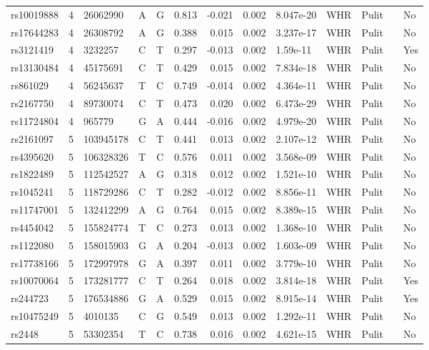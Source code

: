 \documentclass[11pt,twoside]{bristolthesis}
\begin{document}
\begin{longtable}[t]{lrlllrrrlllll}
rs10019888 & 4 & 26062990 & A & G & 0.813 & -0.021 & 0.002 & 8.047e-20 & WHR & Pulit &  & No\\
\addlinespace
rs17644283 & 4 & 26308792 & A & G & 0.388 & 0.015 & 0.002 & 3.237e-17 & WHR & Pulit &  & No\\
rs3121419 & 4 & 3232257 & C & T & 0.297 & -0.013 & 0.002 & 1.59e-11 & WHR & Pulit &  & Yes\\
rs13130484 & 4 & 45175691 & C & T & 0.429 & 0.015 & 0.002 & 7.834e-18 & WHR & Pulit &  & No\\
rs861029 & 4 & 56245637 & T & C & 0.749 & -0.014 & 0.002 & 4.364e-11 & WHR & Pulit &  & No\\
rs2167750 & 4 & 89730074 & C & T & 0.473 & 0.020 & 0.002 & 6.473e-29 & WHR & Pulit &  & No\\
\addlinespace
rs11724804 & 4 & 965779 & G & A & 0.444 & -0.016 & 0.002 & 4.979e-20 & WHR & Pulit &  & No\\
rs2161097 & 5 & 103945178 & C & T & 0.441 & 0.013 & 0.002 & 2.107e-12 & WHR & Pulit &  & No\\
rs4395620 & 5 & 106328326 & T & C & 0.576 & 0.011 & 0.002 & 3.568e-09 & WHR & Pulit &  & No\\
rs1822489 & 5 & 112542527 & A & G & 0.318 & 0.012 & 0.002 & 1.521e-10 & WHR & Pulit &  & No\\
rs1045241 & 5 & 118729286 & C & T & 0.282 & -0.012 & 0.002 & 8.856e-11 & WHR & Pulit &  & No\\
\addlinespace
rs11747001 & 5 & 132412299 & A & G & 0.764 & 0.015 & 0.002 & 8.389e-15 & WHR & Pulit &  & No\\
rs4454042 & 5 & 155824774 & T & C & 0.273 & 0.013 & 0.002 & 1.368e-10 & WHR & Pulit &  & No\\
rs1122080 & 5 & 158015903 & G & A & 0.204 & -0.013 & 0.002 & 1.603e-09 & WHR & Pulit &  & No\\
rs17738166 & 5 & 172997978 & G & A & 0.397 & 0.011 & 0.002 & 3.779e-10 & WHR & Pulit &  & No\\
rs10070064 & 5 & 173281777 & C & T & 0.264 & 0.018 & 0.002 & 3.814e-18 & WHR & Pulit &  & Yes\\
\addlinespace
rs244723 & 5 & 176534886 & G & A & 0.529 & 0.015 & 0.002 & 8.915e-14 & WHR & Pulit &  & Yes\\
rs10475249 & 5 & 4010135 & C & G & 0.549 & 0.013 & 0.002 & 1.292e-11 & WHR & Pulit &  & No\\
rs2448 & 5 & 53302354 & T & C & 0.738 & 0.016 & 0.002 & 4.621e-15 & WHR & Pulit &  & No\\

\end{longtable}
\end{document}
